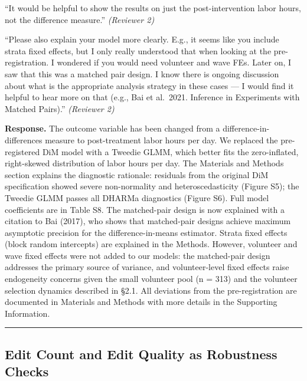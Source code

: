 \documentclass[12pt]{article}
\newenvironment{reviewquote}{%
  \def\FrameCommand{{\color{quotebarcolor}\vrule width 2pt}\colorbox{quotebg}}%
  \MakeFramed{\advance\hsize-\width \FrameRestore}%
  \small
}{%
  \endMakeFramed
}
\begin{document}
\begin{reviewquote}
``It would be helpful to show the results on just the post-intervention labor hours, not the difference measure.'' \textit{(Reviewer 2)}
\end{reviewquote}

\begin{reviewquote}
``Please also explain your model more clearly. E.g., it seems like you include strata fixed effects, but I only really understood that when looking at the pre-registration. I wondered if you would need volunteer and wave FEs. Later on, I saw that this was a matched pair design. I know there is ongoing discussion about what is the appropriate analysis strategy in these cases --- I would find it helpful to hear more on that (e.g., Bai et al.\ 2021. Inference in Experiments with Matched Pairs).'' \textit{(Reviewer 2)}
\end{reviewquote}

\textbf{Response.} The outcome variable has been changed from a difference-in-differences measure to post-treatment labor hours per day. We replaced the pre-registered DiM model with a Tweedie GLMM, which better fits the zero-inflated, right-skewed distribution of labor hours per day. The Materials and Methods section explains the diagnostic rationale: residuals from the original DiM specification showed severe non-normality and heteroscedasticity (Figure S5); the Tweedie GLMM passes all DHARMa diagnostics (Figure S6). Full model coefficients are in Table S8. The matched-pair design is now explained with a citation to Bai (2017), who shows that matched-pair designs achieve maximum asymptotic precision for the difference-in-means estimator. Strata fixed effects (block random intercepts) are explained in the Methods. However, volunteer and wave fixed effects were not added to our models: the matched-pair design addresses the primary source of variance, and volunteer-level fixed effects raise endogeneity concerns given the small volunteer pool (n = 313) and the volunteer selection dynamics described in \S2.1. All deviations from the pre-registration are documented in Materials and Methods with more details in the Supporting Information.

\bigskip\hrule\bigskip

\subsection{Edit Count and Edit Quality as Robustness Checks}
\end{document}
